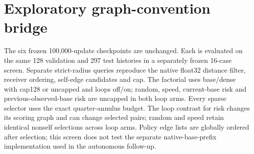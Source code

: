 \section{Exploratory graph-convention bridge}
\label{sec:graph-bridge}
The six frozen 100,000-update checkpoints are unchanged. Each is evaluated on
the same 128 validation and 297 test histories in a separately frozen 16-case
screen. Separate strict-radius queries reproduce the native float32 distance
filter, receiver ordering, self-edge candidates and cap. The factorial uses
base/dense with cap128 or uncapped and loops off/on; random, speed,
current-base risk and previous-observed-base risk are uncapped in both loop arms.
Every sparse selector uses the exact quarter-annulus budget. The loop contrast
for risk changes its scoring graph and can change selected pairs; random and
speed retain identical nonself selections across loop arms.
Policy edge lists are globally ordered after selection; this screen does not
test the separate native-base-prefix implementation used in the autonomous
follow-up.

